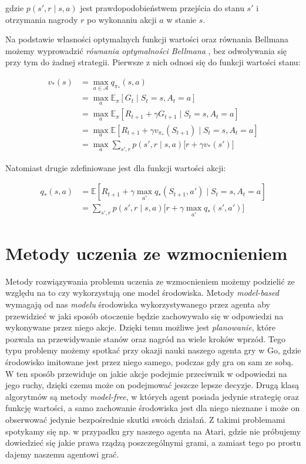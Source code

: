 \documentclass[licencjacka]{pracamgr}
\begin{document}
gdzie $ p(s', r \mid s, a) $ jest prawdopodobieństwem przejścia do stanu $s'$ i  otrzymania nagrody $r$ po wykonaniu akcji $a$ w stanie $s$.

Na podstawie własności optymalnych funkcji wartości oraz równania Bellmana możemy wyprowadzić \emph{równania optymalności Bellmana} \cite{bellman1954, bellman1957}, bez odwoływania się przy tym do żadnej strategii. Pierwsze z nich odnosi się do funkcji wartości stanu:

\begin{align}
v_{\ast}(s) &= \max_{a \in \mathcal{A}} q_{\pi_{\ast}}(s, a) \nonumber \\
&= \max_a \mathbb{E}_{\pi}[G_t \mid S_t = s, A_t = a]  \nonumber \\
&= \max_a \mathbb{E}_{\pi}[R_{t+1} + \gamma G_{t+1} \mid S_t = s, A_t = a] \nonumber \\
&= \max_a \mathbb{E}[R_{t+1} + \gamma v_{\pi_{\ast}}(S_{t+1}) \mid S_t = s, A_t = a] \nonumber \\
&= \max_a \sum_{s', r} p(s', r \mid s, a) \Big[r + \gamma v_{\ast}(s') \Big]
\end{align}

Natomiast drugie zdefiniowane jest dla funkcji wartości akcji:

\begin{align}
q_{\ast}(s, a) &= \mathbb{E}[R_{t+1} + \gamma \max_{a'} q_{\ast} (S_{t+1}, a') \mid S_t = s, A_t = a] \nonumber \\
&= \sum_{s', r} p(s', r \mid s, a) \Big[r + \gamma \max_{a'} q_{\ast} (s', a') \Big]
\end{align}

\section{Metody uczenia ze wzmocnieniem}

Metody rozwiązywania problemu uczenia ze wzmocnieniem możemy podzielić ze względu na to czy wykorzystują one model środowiska. Metody \emph{model-based} wymagają od nas \emph{modelu} środowiska wykorzystywanego przez agenta aby przewidzieć w jaki sposób otoczenie będzie zachowywało się w odpowiedzi na wykonywane przez niego akcje.
Dzięki temu możliwe jest \emph{planowanie}, które pozwala na przewidywanie stanów oraz nagród na wiele kroków wprzód. Tego typu problemy możemy spotkać przy okazji nauki naszego agenta gry w Go\cite{alphago2016, alphagozero}, gdzie środowisko imitowane jest przez niego samego, podczas gdy gra on sam ze sobą. W ten sposób przewiduje on jakie akcje podejmie przeciwnik w odpowiedzi na jego ruchy, dzięki czemu może on podejmować jeszcze lepsze decyzje.
Drugą klasą algorytmów są metody \emph{model-free}, w których agent posiada jedynie strategię oraz funkcję wartości, a samo zachowanie środowiska jest dla niego nieznane i może on obserwować jedynie bezpośrednie skutki swoich działań. Z takimi problemami spotykamy się np. w przypadku gry naszego agenta na Atari, gdzie nie próbujemy dowiedzieć się jakie prawa rządzą poszczególnymi grami, a zamiast tego po prostu dajemy naszemu agentowi grać.
\end{document}
